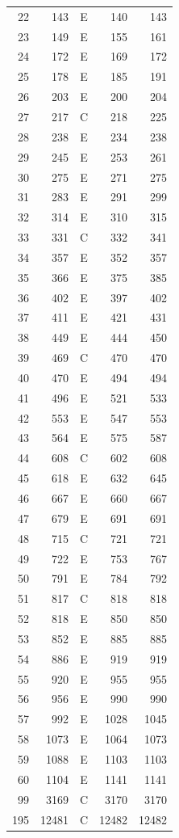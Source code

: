 \begin{longtable}{rrcrr}
22 & 143 & E & 140 & 143 \\
23 & 149 & E & 155 & 161 \\
24 & 172 & E & 169 & 172 \\
25 & 178 & E & 185 & 191 \\
26 & 203 & E & 200 & 204 \\
27 & 217 & C & 218 & 225 \\
28 & 238 & E & 234 & 238 \\
29 & 245 & E & 253 & 261 \\
30 & 275 & E & 271 & 275 \\
31 & 283 & E & 291 & 299 \\
32 & 314 & E & 310 & 315 \\
33 & 331 & C & 332 & 341 \\
34 & 357 & E & 352 & 357 \\
35 & 366 & E & 375 & 385 \\
36 & 402 & E & 397 & 402 \\
37 & 411 & E & 421 & 431 \\
38 & 449 & E & 444 & 450 \\
39 & 469 & C & 470 & 470 \\
40 & 470 & E & 494 & 494 \\
41 & 496 & E & 521 & 533 \\
42 & 553 & E & 547 & 553 \\
43 & 564 & E & 575 & 587 \\
44 & 608 & C & 602 & 608 \\
45 & 618 & E & 632 & 645 \\
46 & 667 & E & 660 & 667 \\
47 & 679 & E & 691 & 691 \\
48 & 715 & C & 721 & 721 \\
49 & 722 & E & 753 & 767 \\
50 & 791 & E & 784 & 792 \\
51 & 817 & C & 818 & 818 \\
52 & 818 & E & 850 & 850 \\
53 & 852 & E & 885 & 885 \\
54 & 886 & E & 919 & 919 \\
55 & 920 & E & 955 & 955 \\
56 & 956 & E & 990 & 990 \\
57 & 992 & E & 1028 & 1045 \\
58 & 1073 & E & 1064 & 1073 \\
59 & 1088 & E & 1103 & 1103 \\
60 & 1104 & E & 1141 & 1141 \\
99 & 3169 & C & 3170 & 3170 \\
195 & 12481 & C & 12482 & 12482 \\
\end{longtable}
\endgroup

